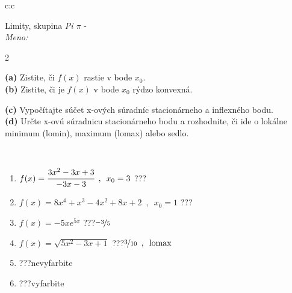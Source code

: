 \documentclass[10pt]{report}
\begin{document}
\begin{tabular}{c:c}
\begin{minipage}[c][104.5mm][t]{0.5\linewidth}
\begin{center}
\vspace{7mm}
{\huge Limity, skupina \textit{Pi $\pi$} -}\\[5mm]
\textit{Meno:}\phantom{xxxxxxxxxxxxxxxxxxxxxxxxxxxxxxxxxxxxxxxxxxxxxxxxxxxxxxxxxxxxxxxxx}\\[5mm]
\begin{minipage}{0.95\linewidth}
\begin{center}
{\small \begin{multicols}{2} \raggedright
\textbf{(a)} Zistite, či \(f(x)\) rastie v bode \(x_0\). \\[1mm]
\textbf{(b)} Zistite, či je \(f(x)\) v bode \(x_0\) rýdzo konvexná. \par \columnbreak
\textbf{(c)} Vypočítajte súčet x-ových súradníc stacionárneho a inflexného bodu. \\[1mm]
\textbf{(d)} Určte x-ovú súradnicu stacionárneho bodu a rozhodnite, či ide o lokálne minimum (lomin), maximum (lomax) alebo sedlo. \\[1mm]
\end{multicols}
}
\end{center}
\end{minipage}
\\[4mm]
\begin{minipage}{0.79\linewidth}
\begin{center}
\begin{varwidth}{\linewidth}
\begin{enumerate}
\normalsize
\item $f(x)=\cfrac{3x^2-3x+3}{-3x-3}\enspace , \enspace x_0=3$\quad \dotfill\; ???\;\dotfill \quad {}
\item $f(x)=8x^4+x^3-4x^2+8x+2\enspace , \enspace x_0=1$\quad \dotfill\; ???\;\dotfill \quad {}
\item $f(x)=-5xe^{5x}$\quad \dotfill\; ???\;\dotfill \quad $\nicefrac{-3}{5}$
\item $f(x)=\sqrt{5x^2-3x+1}$\quad \dotfill\; ???\;\dotfill \quad $\nicefrac{3}{10}\enspace , \enspace\text{lomax}$
\item \quad \dotfill\; ???\;\dotfill \quad nevyfarbite
\item \quad \dotfill\; ???\;\dotfill \quad vyfarbite
\end{enumerate}
\end{varwidth}
\end{center}

\end{minipage}
\end{center}
\end{minipage}
\end{tabular}
\end{document}
